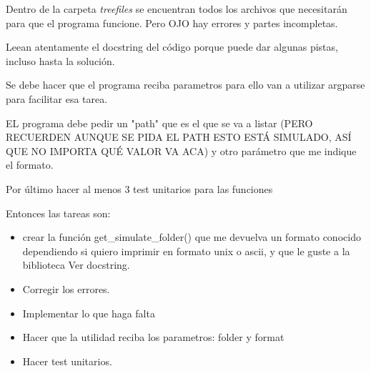 \documentclass[12pt, spanish]{article}
\begin{document}
Dentro de la carpeta \textit{treefiles} se encuentran todos los archivos que necesitarán para que el programa funcione. Pero OJO hay errores y partes incompletas.

Leean atentamente el docstring del código porque puede dar algunas pistas, incluso hasta la solución.

Se debe hacer que el programa reciba parametros para ello van a utilizar argparse para facilitar esa tarea. 

EL programa debe pedir un "path" que es el que se va a listar (PERO RECUERDEN
AUNQUE SE PIDA EL PATH ESTO ESTÁ SIMULADO, ASÍ QUE NO IMPORTA QUÉ VALOR VA ACA) y 
otro parámetro que me indique el formato.

Por último hacer al menos 3 test unitarios para las funciones

Entonces las tareas son:

\begin{itemize}
	\item crear la función get\_simulate\_folder() que me devuelva un formato conocido dependiendo si quiero imprimir en formato unix o ascii, y que le guste a la biblioteca Ver docstring.
	\item Corregir los errores.
    \item Implementar lo que haga falta
    \item Hacer que la utilidad reciba los parametros: folder y format
    \item Hacer test unitarios.
\end{itemize}
\end{document}
